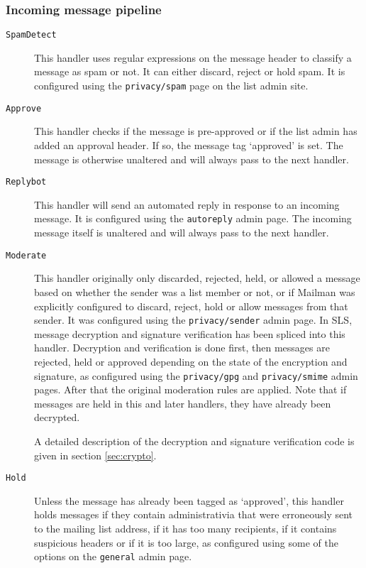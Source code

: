 \documentclass[a4]{article}
\newcommand{\page}[1]{\nolinkurl{#1}}
\begin{document}
\subsubsection{Incoming message pipeline}\label{sec:incomingpipeline}

\begin{description}
\item[\tt SpamDetect]
This handler uses regular expressions on the message header to classify a message as spam or not.
It can either discard, reject or hold spam. It is configured using the \page{privacy/spam} page on the list admin site.

\item[\tt Approve]
This handler checks if the message is pre-approved or if the list admin has added an approval header.
If so, the message tag `approved' is set.
The message is otherwise unaltered and will always pass to the next handler.

\item[\tt Replybot]
This handler will send an automated reply in response to an incoming message.
It is configured using the \page{autoreply} admin page.
The incoming message itself is unaltered and will always pass to the next handler.

\item[\tt Moderate]
This handler originally only discarded, rejected, held, or allowed a message based on whether the sender was a list member or not,
or if Mailman was explicitly configured to discard, reject, hold or allow messages from that sender.
It was configured using the \page{privacy/sender} admin page.
In SLS, message decryption and signature verification has been spliced into this handler.
Decryption and verification is done first,
then messages are rejected, held or approved depending on the state of the encryption and signature,
as configured using the \page{privacy/gpg} and \page{privacy/smime} admin pages.
After that the original moderation rules are applied.
Note that if messages are held in this and later handlers, they have already been decrypted.

A detailed description of the decryption and signature verification code is given in section \ref{sec:crypto}.

\item[\tt Hold]
Unless the message has already been tagged as `approved',
this handler holds messages if they contain administrativia that were erroneously sent to the mailing list address,
if it has too many recipients, if it contains suspicious headers or if it is too large,
as configured using some of the options on the \page{general} admin page.


\end{description}
\end{document}
